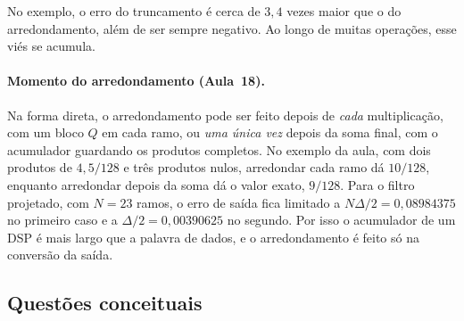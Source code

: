 \documentclass[11pt,a4paper]{article}
\newcommand{\MetricaEQRamo}{10}
\newcommand{\MetricaEQSoma}{9}
\newcommand{\MetricaEErroRamo}{0{,}08984375}
\newcommand{\MetricaEErroSoma}{0{,}00390625}
\begin{document}
No exemplo, o erro do truncamento é cerca de $3,4$ vezes maior que o do arredondamento, além de ser sempre negativo. Ao longo de muitas operações, esse viés se acumula.

\paragraph{Momento do arredondamento (Aula~18).} Na forma direta, o arredondamento pode ser feito depois de \emph{cada} multiplicação, com um bloco $Q$ em cada ramo, ou \emph{uma única vez} depois da soma final, com o acumulador guardando os produtos completos. No exemplo da aula, com dois produtos de $4,5/128$ e três produtos nulos, arredondar cada ramo dá $\MetricaEQRamo/128$, enquanto arredondar depois da soma dá o valor exato, $\MetricaEQSoma/128$. Para o filtro projetado, com $N = 23$ ramos, o erro de saída fica limitado a $N\Delta/2 = \MetricaEErroRamo$ no primeiro caso e a $\Delta/2 = \MetricaEErroSoma$ no segundo. Por isso o acumulador de um DSP é mais largo que a palavra de dados, e o arredondamento é feito só na conversão da saída.

\subsection{Questões conceituais}
\end{document}
